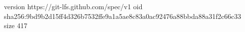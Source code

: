 version https://git-lfs.github.com/spec/v1
oid sha256:9bd9b2d15ff4d326b7532ffe9a1a5ae8c83a0ac92476a88bbda88a31f2c66c33
size 417

